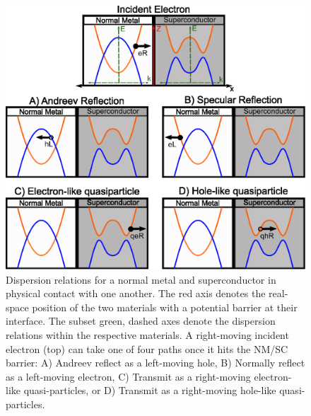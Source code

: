 \begin{figure}
    \centering
    \includegraphics[width=\textwidth]{Appendices/Figures/AndreevDiagram.eps}
    \caption{Dispersion relations for a normal metal and superconductor in physical contact with one another. The red axis denotes the real-space position of the two materials with a potential barrier at their interface. The subset green, dashed axes denote the dispersion relations within the respective materials. A right-moving incident electron (top) can take one of four paths once it hits the NM/SC barrier: A) Andreev reflect as a left-moving hole, B) Normally reflect as a left-moving electron, C) Transmit as a right-moving electron-like quasi-particles, or D) Transmit as a right-moving hole-like quasi-particles.}
    \label{fig:AndreevDiagram}
\end{figure}

